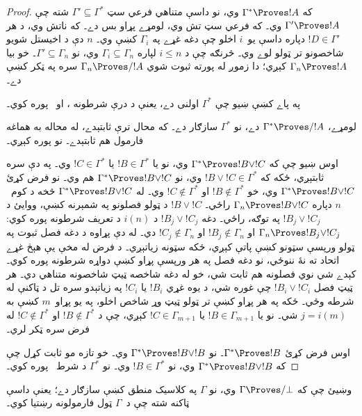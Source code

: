 \documentclass[../../../include/open-logic-section]{subfiles}
\begin{document}
\begin{proof}
  که $\Gamma^* \Proves !A$ وي، نو داسې متناهي فرعي سټ
  $\Gamma' \subseteq \Gamma^*$ شته چې $\Gamma' \Proves !A$
  وي۔ که فرعي سټ تش وي، لومړے پړاو بس دے۔ که ناتش وي، د هر
  $!D \in \Gamma'$ دپاره داسې يو~$i$ اخلو چې دغه غړے په $\Gamma_i$
  کښې وي۔ $n$ دې د اخيستل شويو شاخصونو تر ټولو لوے وي۔ څرنګه چې د
  $i \le n$ لپاره $\Gamma_i \subseteq \Gamma_n$ وي، نو
  $\Gamma' \subseteq \Gamma_n$۔ خو بيا $\Gamma_n \Proves !A$
  کېږي؛ دا زموږ له پورته ثبوت شوي $\Gamma_n \Proves/ !A$ سره
  په ټکر کښې دے۔

  په پاے کښې ښيو چې $\Gamma^*$ اولنی دے، يعنې د
   درې شرطونه ،
   او~ پوره کوي۔

  لومړے، $\Gamma^* \Proves/ !A$ دے، نو $\Gamma^*$ سازګار
  دے۔ که محال ترې ثابتېدے، له محاله به هماغه فارمول هم
  ثابتېدے۔ نو  پوره کېږي۔

  اوس ښيو چې که $\Gamma^* \Proves !B \lor !C$ وي، نو يا
  $!B \in \Gamma^*$ يا $!C \in \Gamma^*$ وي۔ په دې سره
   ثابتېږي، ځکه که $!B \lor !C \in \Gamma^*$
  وي، نو $\Gamma^* \Proves !B \lor !C$ هم وي۔ نو فرض کړئ
  $\Gamma^* \Proves !B \lor !C$ وي، خو $!B \notin \Gamma^*$
  او $!C \notin \Gamma^*$ وي۔ له $\Gamma^* \Proves !B \lor !C$
  څخه د کوم~$n$ دپاره $\Gamma_n \Proves !B \lor !C$ راځي۔
  $!B \lor !C$ د ټولو فصلونو په شمېرنه کښې، ووايئ د
  $!B_j \lor !C_j$ په توګه، راځي۔ دغه $!B_j \lor !C_j$ د
  $i(n)$ د تعريف شرطونه پوره کوي: $\Gamma_n \Proves !B_j
  \lor !C_j$ او $!B_j \notin \Gamma_n$ او $!C_j \notin \Gamma_n$
  دي۔ له دې پړاوه د دغه فصل ثبوت په ټولو ورپسې سټونو کښې
  پاتې کېږي، ځکه سټونه زياتېږي۔ د فرض له مخې يې هېڅ غړے اتحاد
  ته نۀ ننوځي، نو دغه فصل په هر ورپسې پړاو کښې دواړه شرطونه
  پوره کوي۔ کېدے شي نوي فصلونه هم ثابت شي، خو له دغه شاخصه
  ټيټ شاخصونه متناهي دي۔ هر ټيټ فصل $!B_i \lor !C_i$ چې
  غوره شي، د يوه غړي $!B_i$ يا $!C_i$ په زياتېدو سره
  تل د ټاکنې له شرطه وځي۔ ځکه په هر پړاو کښې تر ټولو ټيټ
  وړ شاخص اخلو، په يو پړاو~$m$ کښې به $j = i(m)$ شي۔
  نو يا $!B \in \Gamma_{m+1}$ يا $!C \in \Gamma_{m+1}$
  کېږي، چې د $!B \notin \Gamma^*$ او $!C \notin \Gamma^*$
  له فرض سره ټکر لري۔

  اوس فرض کړئ $\Gamma^* \Proves !B$۔ نو $\Gamma^* \Proves !B \lor
  !B$ وي۔ خو تازه مو ثابت کړل چې که $\Gamma^* \Proves !B \lor !B$
  وي، نو $!B \in \Gamma^*$ وي۔ نو $\Gamma^*$ د
   شرط~ پوره کوي۔
\end{proof}

\begin{prob}
وښيئ چې که $\Gamma \Proves/ \bot$ وي، نو $\Gamma$ په کلاسيک
منطق کښې سازګار دے؛ يعنې داسې ټاکنه شته چې د~$\Gamma$ ټول
فارمولونه رښتيا کوي۔
\end{prob}
\end{document}
